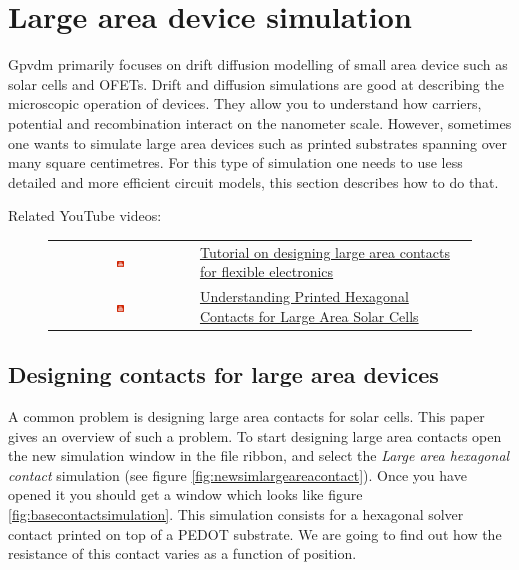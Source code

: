 \chapter{Large area device simulation}
\label{ref:la}
Gpvdm primarily focuses on drift diffusion modelling of small area device such as solar cells and OFETs. Drift and diffusion simulations are good at describing the microscopic operation of devices. They allow you to understand how carriers, potential and recombination interact on the nanometer scale.  However, sometimes one wants to simulate large area devices such as printed substrates spanning over many square centimetres.  For this type of simulation one needs to use less detailed and more efficient circuit models, this section describes how to do that.

Related YouTube videos:
\begin{figure}[H]

\begin{tabular}{ c l }

\includegraphics[width=0.05\textwidth]{./images/youtube.png}

&
\href{https://www.youtube.com/watch?v=XpGr9C_gr7E}{Tutorial on designing large area contacts for flexible electronics}\
\\
\includegraphics[width=0.05\textwidth]{./images/youtube.png}

&
\href{https://www.youtube.com/watch?v=ObBJIE9TmYo}{Understanding Printed Hexagonal Contacts for Large Area Solar Cells}

\end{tabular}
\end{figure}



\section{Designing contacts for large area devices}
A common problem is designing large area contacts for solar cells.  This paper \cite{solak2021understanding} gives an overview of such a problem.   To start designing large area contacts open the new simulation window in the file ribbon, and select the \emph{Large area hexagonal contact} simulation (see figure \ref{fig:newsimlargeareacontact}).  Once you have opened it you should get a window which looks like figure \ref{fig:basecontactsimulation}.  This simulation consists for a hexagonal solver contact printed on top of a PEDOT substrate.  We are going to find out how the resistance of this contact varies as a function of position.




